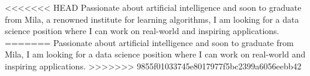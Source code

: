 

\begin{cvparagraph}




<<<<<<< HEAD
Passionate about artificial intelligence and soon to graduate from Mila, a renowned institute for learning algorithms, I am looking for a data science position where I can work on real-world and inspiring applications.
=======
Passionate about artificial intelligence and soon to graduate from Mila, I am looking for a data science position where I can work on real-world and inspiring applications.
>>>>>>> 9855f01033745e8017977f5bc2399a6056eebb42


\end{cvparagraph}
